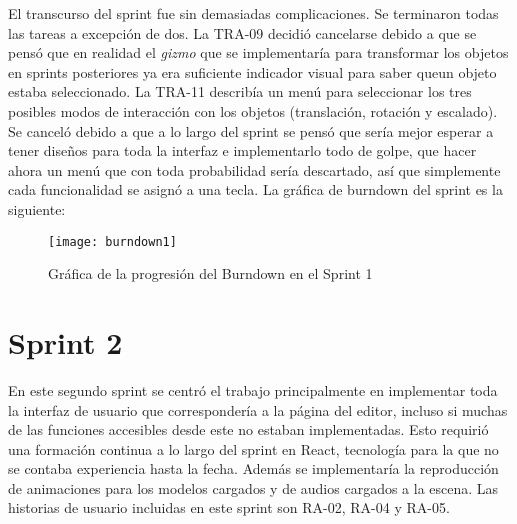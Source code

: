 El transcurso del sprint fue sin demasiadas complicaciones. Se terminaron todas las tareas a excepción de dos. La TRA-09 decidió cancelarse debido a que se pensó que en realidad el \textit{gizmo} que se implementaría para transformar los objetos en sprints posteriores ya era suficiente indicador visual para saber queun objeto estaba seleccionado. La TRA-11 describía un menú para seleccionar los tres posibles modos de interacción con los objetos (translación, rotación y escalado). Se canceló debido a que a lo largo del sprint se pensó que sería mejor esperar a tener diseños para toda la interfaz e implementarlo todo de golpe, que hacer ahora un menú que con toda probabilidad sería descartado, así que simplemente cada funcionalidad se asignó a una tecla. La gráfica de burndown del sprint es la siguiente:

\begin{figure}[h]
    \centering
    \texttt{[image: burndown1]}
    \caption[Burndown Sprint 1]{Gráfica de la progresión del Burndown en el Sprint 1}
\end{figure}

\section{Sprint 2}

En este segundo sprint se centró el trabajo principalmente en implementar toda la interfaz de usuario que correspondería a la página del editor, incluso si muchas de las funciones accesibles desde este no estaban implementadas. Esto requirió una formación continua a lo largo del sprint en React, tecnología para la que no se contaba experiencia hasta la fecha. Además se implementaría la reproducción de animaciones para los modelos cargados y de audios cargados a la escena. Las historias de usuario incluidas en este sprint son RA-02, RA-04 y RA-05.

\begin{table}[H]
\label{TRA-14}
\end{table}


